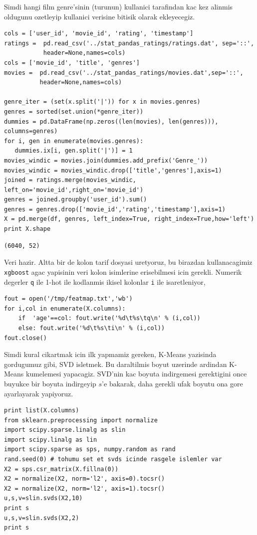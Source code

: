 \documentclass[12pt,fleqn]{article}\usepackage{../common}
\begin{document}
Simdi hangi film genre'sinin (turunun) kullanici tarafindan kac kez alinmis
oldugunu ozetleyip kullanici verisine bitisik olarak ekleyecegiz. 

\begin{verbatim}
cols = ['user_id', 'movie_id', 'rating', 'timestamp']
ratings =  pd.read_csv('../stat_pandas_ratings/ratings.dat', sep='::',
           header=None,names=cols)
cols = ['movie_id', 'title', 'genres']
movies =  pd.read_csv('../stat_pandas_ratings/movies.dat',sep='::',
          header=None,names=cols)

genre_iter = (set(x.split('|')) for x in movies.genres)
genres = sorted(set.union(*genre_iter))
dummies = pd.DataFrame(np.zeros((len(movies), len(genres))), columns=genres)
for i, gen in enumerate(movies.genres):
   dummies.ix[i, gen.split('|')] = 1
movies_windic = movies.join(dummies.add_prefix('Genre_'))
movies_windic = movies_windic.drop(['title','genres'],axis=1)
joined = ratings.merge(movies_windic, left_on='movie_id',right_on='movie_id')
genres = joined.groupby('user_id').sum()
genres = genres.drop(['movie_id','rating','timestamp'],axis=1)
X = pd.merge(df, genres, left_index=True, right_index=True,how='left')
print X.shape
\end{verbatim}

\begin{verbatim}
(6040, 52)
\end{verbatim}

Veri hazir. Altta bir de kolon tarif dosyasi uretyoruz, bu birazdan
kullanacagimiz \verb!xgboost! agac yapisinin veri kolon isimlerine
erisebilmesi icin gerekli. Numerik degerler \verb!q!  ile 1-hot ile
kodlanmis ikisel kolonlar \verb!i! ile isaretleniyor,

\begin{verbatim}
fout = open('/tmp/featmap.txt','wb')
for i,col in enumerate(X.columns):
    if  'age'==col: fout.write('%d\t%s\tq\n' % (i,col))
    else: fout.write('%d\t%s\ti\n' % (i,col))    
fout.close()
\end{verbatim}

Simdi kural cikartmak icin ilk yapmamiz gereken, K-Means yazisinda
gordugumuz gibi, SVD isletmek. Bu daraltilmis boyut uzerinde ardindan
K-Means kumelemesi yapacagiz. SVD'nin kac boyuta indirgemesi gerektigini
once buyukce bir boyuta indirgeyip $s$'e bakarak, daha gerekli ufak boyutu
ona gore ayarlayarak yapiyoruz.

\begin{verbatim}
print list(X.columns)
from sklearn.preprocessing import normalize
import scipy.sparse.linalg as slin
import scipy.linalg as lin
import scipy.sparse as sps, numpy.random as rand
rand.seed(0) # tohumu set et svds icinde rasgele islemler var
X2 = sps.csr_matrix(X.fillna(0))
X2 = normalize(X2, norm='l2', axis=0).tocsr()
X2 = normalize(X2, norm='l2', axis=1).tocsr()    
u,s,v=slin.svds(X2,10)
print s
u,s,v=slin.svds(X2,2)
print s
\end{verbatim}
\end{document}
